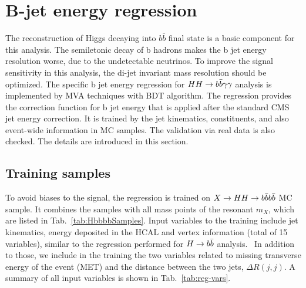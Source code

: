 



\clearpage
\section{B-jet energy regression} \label{sec:breg}

The reconstruction of Higgs decaying into $b\bar{b}$ final state is a basic component for this analysis.
The semiletonic decay of b hadrons makes the b jet energy resolution worse, due to the undetectable neutrinos.
To improve the signal sensitivity in this analysis, the di-jet invariant mass resolution should be optimized.
The specific b jet energy regression for $HH\to b\bar{b}\gamma\gamma$ analysis is implemented by MVA techniques with BDT algorithm.
The regression provides the correction function for b jet energy that is applied after the standard CMS jet energy correction.
It is trained by the jet kinematics, constituents, and also event-wide information in MC samples.
The validation via real data is also checked.
The details are introduced in this section.

\subsection{Training samples}

To avoid biases to the signal, the regression is trained on $X\to HH\to b\bar{b}b\bar{b}$ MC sample.
It combines the samples with all mass points of the resonant $m_X$, which are listed in Tab.~\ref{tab:HbbbbSamples}.
Input variables to the training include jet kinematics, energy deposited in the HCAL and vertex information (total of 15 variables), similar to the regression
performed for $H\to b\bar{b}$ analysis.~\cite{CMS-PAS-HIG-16-003}
In addition to those, we include in the training the two variables related to missing transverse energy of the event (MET) and the distance between the two jets, $\Delta R(j,j)$.
A summary of all input variables is shown in Tab.~\ref{tab:reg-vars}.

